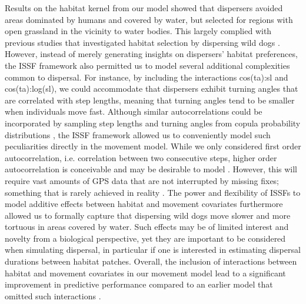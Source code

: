 \documentclass[abstract=on,10pt,a4paper,bibliography=totocnumbered]{article}
\begin{document}
Results on the habitat kernel from our model showed that dispersers avoided
areas dominated by humans and covered by water, but selected for regions with
open grassland in the vicinity to water bodies. This largely complied with
previous studies that investigated habitat selection by dispersing wild dogs
\citep{DaviesMostert.2012, Masenga.2016, Woodroffe.2019, Oneill.2020,
Hofmann.2021}. However, instead of merely generating insights on dispersers'
habitat preferences, the ISSF framework also permitted us to model several
additional complexities common to dispersal. For instance, by including the
interactions \textsf{cos(ta):sl} and \textsf{cos(ta):log(sl)}, we could
accommodate that dispersers exhibit turning angles that are correlated with step
lengths, meaning that turning angles tend to be smaller when individuals move
fast. Although similar autocorrelations could be incorporated by sampling step
lengths and turning angles from copula probability distributions
\citep{Hodel.2022}, the ISSF framework allowed us to conveniently model such
peculiarities directly in the movement model. While we only considered first
order autocorrelation, i.e. correlation between two consecutive steps, higher
order autocorrelation is conceivable and may be desirable to model
\citep{Dray.2010, McClintock.2012}. However, this will require vast amounts of
GPS data that are not interrupted by missing fixes; something that is rarely
achieved in reality \citep{Graves.2006}. The power and flexibility of ISSFs to
model additive effects between habitat and movement covariates
\citep{Avgar.2016, Signer.2017} furthermore allowed us to formally capture that
dispersing wild dogs move slower and more tortuous in areas covered by water.
Such effects may be of limited interest and novelty from a biological
perspective, yet they are important to be considered when simulating dispersal,
in particular if one is interested in estimating dispersal durations between
habitat patches. Overall, the inclusion of interactions between habitat and
movement covariates in our movement model lead to a significant improvement in
predictive performance compared to an earlier model that omitted such
interactions \citep{Hofmann.2021}.

\end{document}
